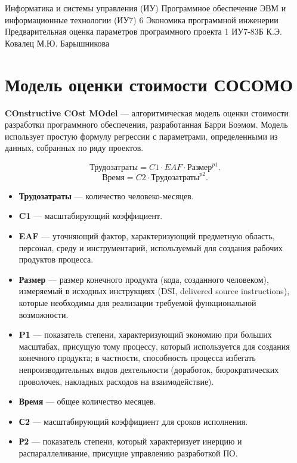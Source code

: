 \documentclass{bmstu}
\begin{document}
\makereporttitle
{Информатика и системы управления (ИУ)}
{Программное обеспечение ЭВМ и информационные технологии (ИУ7)}
{6}
{Экономика программной инженерии}
{Предварительная оценка параметров программного проекта}
{1}
{ИУ7-83Б}
{К.Э. Ковалец}
{М.Ю. Барышникова}


\setcounter{page}{2}

\section*{Модель оценки стоимости СОСОМО}

\textbf{COnstructive COst MOdel} --- алгоритмическая модель оценки стоимости разработки программного обеспечения, разработанная Барри Боэмом. Модель использует простую формулу регрессии с параметрами, определенными из данных, собранных по ряду проектов.

\begin{equation}
    \text{Трудозатраты} = C1 \cdot EAF \cdot \text{Размер}^{p1}.
\end{equation}
\begin{equation}
    \text{Время} = C2 \cdot \text{Трудозатраты}^{p2}.
\end{equation}

\begin{itemize}
    \item \textbf{Трудозатраты} --- количество человеко-месяцев.
    \item \textbf{C1} --- масштабирующий коэффициент.
    \item \textbf{EAF} --- уточняющий фактор, характеризующий предметную область, персонал, среду и инструментарий, используемый для создания рабочих продуктов процесса.
    \item \textbf{Размер} --- размер конечного продукта (кода, созданного человеком), измеряемый в исходных инструкциях (DSI, delivered source instructions), которые необходимы для реализации требуемой функциональной возможности.
    \item \textbf{P1} --- показатель степени, характеризующий экономию при больших масштабах, присущую тому процессу, который используется для создания конечного продукта; в частности, способность процесса избегать непроизводительных видов деятельности (доработок, бюрократических проволочек, накладных расходов на взаимодействие).
    \item \textbf{Время} --- общее количество месяцев.
    \item \textbf{С2} --- масштабирующий коэффициент для сроков исполнения.
    \item \textbf{Р2} --- показатель степени, который характеризует инерцию и распараллеливание, присущие управлению разработкой ПО.
\end{itemize}
\end{document}
